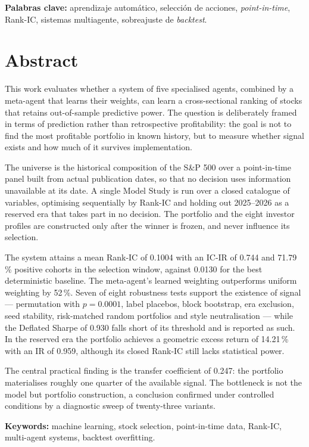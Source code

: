 \vspace{1em}
\noindent\textbf{Palabras clave:} aprendizaje automático, selección de acciones, \textit{point-in-time},
Rank-IC, sistemas multiagente, sobreajuste de \textit{backtest}.

\chapter*{Abstract}

This work evaluates whether a system of five specialised agents, combined by a meta-agent that
learns their weights, can learn a cross-sectional ranking of stocks that retains out-of-sample
predictive power. The question is deliberately framed in terms of prediction rather than
retrospective profitability: the goal is not to find the most profitable portfolio in known history,
but to measure whether signal exists and how much of it survives implementation.

The universe is the historical composition of the S\&P 500 over a point-in-time panel built from
actual publication dates, so that no decision uses information unavailable at its date. A single
Model Study is run over a closed catalogue of variables, optimising sequentially by Rank-IC and
holding out 2025--2026 as a reserved era that takes part in no decision. The portfolio and the eight
investor profiles are constructed only after the winner is frozen, and never influence its
selection.

The system attains a mean Rank-IC of 0.1004 with an IC-IR of 0.744 and 71.79\,\% positive cohorts in
the selection window, against 0.0130 for the best deterministic baseline. The meta-agent's learned
weighting outperforms uniform weighting by 52\,\%. Seven of eight robustness tests support the
existence of signal --- permutation with $p=0.0001$, label placebos, block bootstrap, era exclusion,
seed stability, risk-matched random portfolios and style neutralisation --- while the Deflated
Sharpe of 0.930 falls short of its threshold and is reported as such. In the reserved era the
portfolio achieves a geometric excess return of 14.21\,\% with an IR of 0.959, although its closed
Rank-IC still lacks statistical power.

The central practical finding is the transfer coefficient of 0.247: the portfolio materialises
roughly one quarter of the available signal. The bottleneck is not the model but portfolio
construction, a conclusion confirmed under controlled conditions by a diagnostic sweep of
twenty-three variants.

\vspace{1em}
\noindent\textbf{Keywords:} machine learning, stock selection, point-in-time data, Rank-IC,
multi-agent systems, backtest overfitting.
